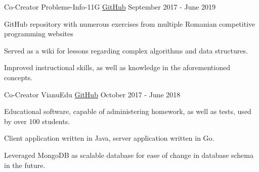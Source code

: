 
\begin{cventries}
  \cventry
    {Co-Creator}
    {Probleme-Info-11G}
    {\href{https://github.com/StormFireFox1/Probleme-Info-11G}{GitHub}}
    {September 2017 - June 2019}
    {
      \begin{cvitems}
        \item {GitHub repository with numerous exercises from multiple Romanian competitive programming websites}
        \item {Served as a wiki for lessons regarding complex algorithms and data structures.}
        \item {Improved instructional skills, as well as knowledge in the aforementioned concepts.}
      \end{cvitems}
    }
    \cventry
      {Co-Creator}
      {VianuEdu}
      {\href{https://github.com/CNITV/VianuEdu}{GitHub}}
      {October 2017 - June 2018}
      {
        \begin{cvitems}
          \item {Educational software, capable of administering homework, as well as tests, used by over 100 students.}
          \item {Client application written in Java, server application written in Go.}
          \item {Leveraged MongoDB as scalable database for ease of change in database schema in the future.}
        \end{cvitems}
      }
\end{cventries}
